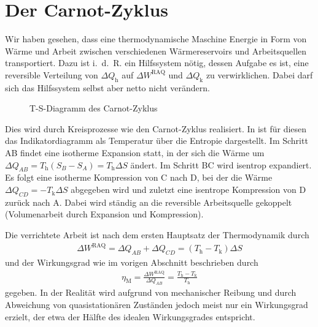 \section{Der Carnot-Zyklus}

Wir haben gesehen, dass eine thermodynamische Maschine Energie in Form von Wärme und Arbeit zwischen verschiedenen Wärmereservoirs und Arbeitsquellen transportiert. Dazu ist i.~d.~R. ein Hilfssystem nötig, dessen Aufgabe es ist, eine reversible Verteilung von $\Delta Q_\mathrm{h}$ auf $\Delta W^\mathrm{RAQ}$ und $\Delta Q_\mathrm{k}$ zu verwirklichen. Dabei darf sich das Hilfssystem selbst aber netto nicht verändern. 

\begin{figure}[htbp]
    \centering
    \tfigCarnotCycleIndicatorDiagram
    \caption{T-S-Diagramm des Carnot-Zyklus}
    \label{fig:CarnotCycleIndicatorDiagram}
\end{figure}

Dies wird durch Kreisprozesse wie den Carnot-Zyklus realisiert. In  ist für diesen das Indikatordiagramm als Temperatur über die Entropie dargestellt. Im Schritt AB findet eine isotherme Expansion statt, in der sich die Wärme um $\Delta Q_{AB}=T_\mathrm{h}(S_B-S_A) = T_\mathrm{h} \Delta S$ ändert. Im Schritt BC wird isentrop expandiert. Es folgt eine isotherme Kompression von C nach D, bei der die Wärme $\Delta Q_{CD}=-T_\mathrm{k}\Delta S$ abgegeben wird und zuletzt eine isentrope Kompression von D zurück nach A. Dabei wird ständig an die reversible Arbeitsquelle gekoppelt (Volumenarbeit durch Expansion und Kompression). 

Die verrichtete Arbeit ist nach dem ersten Hauptsatz der Thermodynamik durch 
\begin{align*}
    \Delta W^\mathrm{RAQ}=\Delta Q_{AB}+\Delta Q_{CD} = (T_\mathrm{h}-T_\mathrm{k})\Delta S
\end{align*}
und der Wirkungsgrad wie im vorigen Abschnitt beschrieben durch 
\begin{align}
    \eta_\mathrm{M} = \frac{\Delta W^\mathrm{RAQ}}{\Delta Q_{AB}} = \frac{T_\mathrm{h}-T_\mathrm{k}}{T_\mathrm{h}}
\end{align}
gegeben. In der Realität wird aufgrund von mechanischer Reibung und durch Abweichung von quasistationären Zuständen jedoch meist nur ein Wirkungsgrad erzielt, der etwa der Hälfte des idealen Wirkungsgrades entspricht. 

